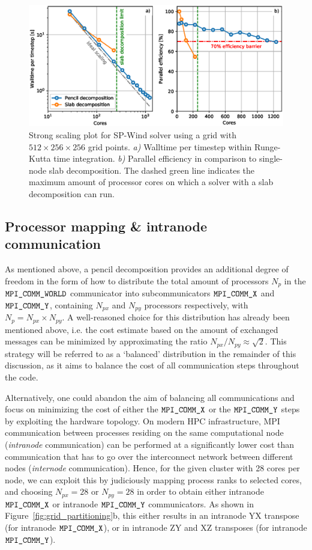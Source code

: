 \begin{figure}
	\includegraphics[width=\textwidth]{figures/meth_strong_scaling.eps}
	\caption{Strong scaling plot for SP-Wind solver using a grid with $512 \times 256 \times 256$ grid points. \emph{a)} Walltime per timestep within Runge-Kutta time integration. \emph{b)} Parallel efficiency in comparison to single-node slab decomposition. The dashed green line indicates the maximum amount of processor cores on which a solver with a slab decomposition can run.\label{fig:strongscaling}}
\end{figure}

\subsection{Processor mapping \& intranode communication}\label{sec:meth_par_map}

As mentioned above, a pencil decomposition provides an additional degree of freedom in the form of how to distribute the total amount of processors $N_p$ in the $\verb|MPI_COMM_WORLD|$ communicator into subcommunicators $\verb|MPI_COMM_X|$ and $\verb|MPI_COMM_Y|$, containing $N_{px}$ and $N_{py}$ processors respectively, with $N_p = N_{px} \times N_{py}$. A well-reasoned choice for this distribution has already been mentioned above, i.e. the cost estimate based on the amount of exchanged messages can be minimized by approximating the ratio $N_{px}/N_{py} \approx \sqrt{2}$. This strategy will be referred to as a `balanced' distribution in the remainder of this discussion, as it aims to balance the cost of all communication steps throughout the code. 

Alternatively, one could abandon the aim of balancing all communications and focus on minimizing the cost of either the $\verb|MPI_COMM_X|$ or the $\verb|MPI_COMM_Y|$ steps by exploiting the hardware topology. On modern HPC infrastructure, MPI communication between processes residing on the same computational node (\emph{intranode} communication) can be performed at a significantly lower cost than communication that has to go over the interconnect network between different nodes (\emph{internode} communication). Hence, for the given cluster with 28 cores per node, we can exploit this by judiciously mapping process ranks to selected cores, and choosing $N_{px} = 28$ or $N_{py} = 28$ in order to obtain either intranode $\verb|MPI_COMM_X|$ or intranode $\verb|MPI_COMM_Y|$ communicators. As shown in Figure~\ref{fig:grid_partitioning}b, this either results in an intranode YX transpose (for intranode $\verb|MPI_COMM_X|$), or in intranode ZY and XZ transposes (for intranode $\verb|MPI_COMM_Y|$). 

